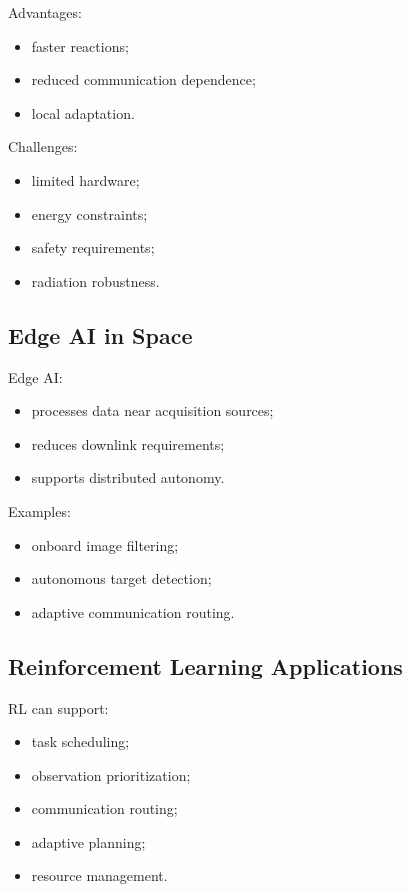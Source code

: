 \documentclass[10pt,a4paper,twocolumn]{article}
\begin{document}
Advantages:
\begin{itemize}
    \item faster reactions;
    \item reduced communication dependence;
    \item local adaptation.
\end{itemize}

Challenges:
\begin{itemize}
    \item limited hardware;
    \item energy constraints;
    \item safety requirements;
    \item radiation robustness.
\end{itemize}


\subsection{Edge AI in Space}

Edge AI:
\begin{itemize}
    \item processes data near acquisition sources;
    \item reduces downlink requirements;
    \item supports distributed autonomy.
\end{itemize}

Examples:
\begin{itemize}
    \item onboard image filtering;
    \item autonomous target detection;
    \item adaptive communication routing.
\end{itemize}


\subsection{Reinforcement Learning Applications}

RL can support:
\begin{itemize}
    \item task scheduling;
    \item observation prioritization;
    \item communication routing;
    \item adaptive planning;
    \item resource management.
\end{itemize}
\end{document}
